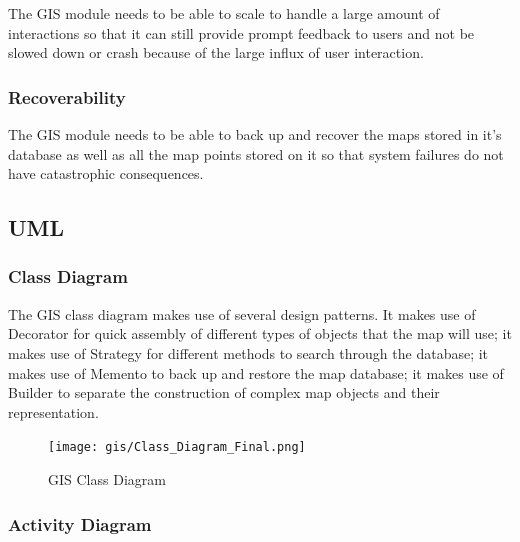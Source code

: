 The GIS module needs to be able to scale to handle a large amount of interactions so that it can still provide prompt feedback to users and not be slowed down or crash because of the large influx of user interaction.



\subsubsection{Recoverability}

The GIS module needs to be able to back up and recover the maps stored in it's database as well as all the map points stored on it so that system failures do not have catastrophic consequences.



\pagebreak

\subsection{UML}

\subsubsection{Class Diagram}

The GIS class diagram makes use of several design patterns. It makes use of Decorator for quick assembly of different types of objects that the map will use; it makes use of Strategy for different methods to search through the database; it makes use of Memento to back up and restore the map database; it makes use of Builder to separate the construction of complex map objects and their representation.



\begin{figure}[H]

	\centering

	\texttt{[image: gis/Class\_Diagram\_Final.png]}

	\caption{GIS Class Diagram}

\end{figure}








\pagebreak

\subsubsection{Activity Diagram}

